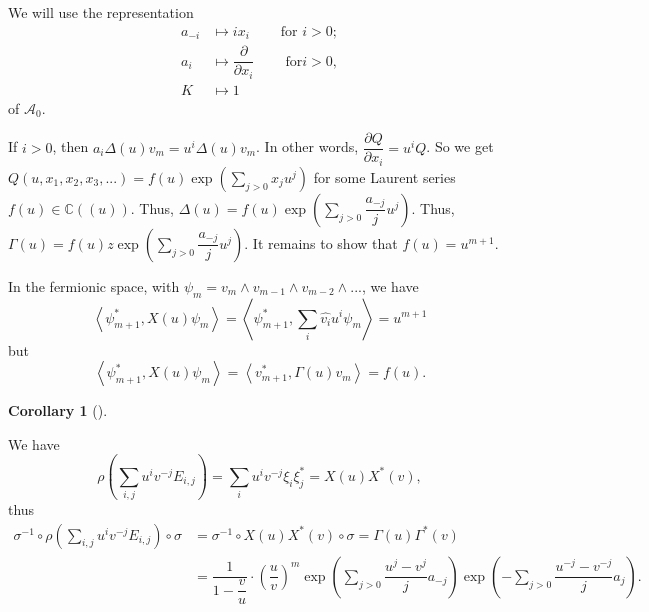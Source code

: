 \documentclass
[numbers=enddot,12pt,final,onecolumn,german,notitlepage]{scrartcl}%
\theoremstyle{definition}
\newtheorem{coro}[theo]{Corollary}
\newenvironment{corollary}[1][]
{\begin{coro}[#1]\begin{leftbar}}
{\end{leftbar}\end{coro}}
\begin{document}
We will use the representation%
\begin{align*}
a_{-i}  &  \mapsto ix_{i}\ \ \ \ \ \ \ \ \ \ \text{for }i>0;\\
a_{i}  &  \mapsto\dfrac{\partial}{\partial x_{i}}\ \ \ \ \ \ \ \ \ \ \text{for
}i>0,\\
K  &  \mapsto1
\end{align*}
of $\mathcal{A}_{0}$.

If $i>0$, then $a_{i}\Delta\left(  u\right)  v_{m}=u^{i}\Delta\left(
u\right)  v_{m}$. In other words, $\dfrac{\partial Q}{\partial x_{i}}=u^{i}Q$.
So we get $Q\left(  u,x_{1},x_{2},x_{3},...\right)  =f\left(  u\right)
\exp\left(  \sum\limits_{j>0}x_{j}u^{j}\right)  $ for some Laurent series
$f\left(  u\right)  \in\mathbb{C}\left(  \left(  u\right)  \right)  $. Thus,
$\Delta\left(  u\right)  =f\left(  u\right)  \exp\left(  \sum\limits_{j>0}%
\dfrac{a_{-j}}{j}u^{j}\right)  $. Thus, $\Gamma\left(  u\right)  =f\left(
u\right)  z\exp\left(  \sum\limits_{j>0}\dfrac{a_{-j}}{j}u^{j}\right)  $. It
remains to show that $f\left(  u\right)  =u^{m+1}$.

In the fermionic space, with $\psi_{m}=v_{m}\wedge v_{m-1}\wedge v_{m-2}%
\wedge...$, we have%
\[
\left\langle \psi_{m+1}^{\ast},X\left(  u\right)  \psi_{m}\right\rangle
=\left\langle \psi_{m+1}^{\ast},\sum\limits_{i}\widehat{v_{i}}u^{i}\psi
_{m}\right\rangle =u^{m+1}%
\]
but%
\[
\left\langle \psi_{m+1}^{\ast},X\left(  u\right)  \psi_{m}\right\rangle
=\left\langle v_{m+1}^{\ast},\Gamma\left(  u\right)  v_{m}\right\rangle
=f\left(  u\right)  .
\]


\begin{corollary}
We have%
\[
\rho\left(  \sum\limits_{i,j}u^{i}v^{-j}E_{i,j}\right)  =\sum\limits_{i}%
u^{i}v^{-j}\xi_{i}\xi_{j}^{\ast}=X\left(  u\right)  X^{\ast}\left(  v\right)
,
\]
thus%
\begin{align*}
\sigma^{-1}\circ\rho\left(  \sum\limits_{i,j}u^{i}v^{-j}E_{i,j}\right)
\circ\sigma &  =\sigma^{-1}\circ X\left(  u\right)  X^{\ast}\left(  v\right)
\circ\sigma=\Gamma\left(  u\right)  \Gamma^{\ast}\left(  v\right) \\
&  =\dfrac{1}{1-\dfrac{v}{u}}\cdot\left(  \dfrac{u}{v}\right)  ^{m}\exp\left(
\sum\limits_{j>0}\dfrac{u^{j}-v^{j}}{j}a_{-j}\right)  \exp\left(
-\sum\limits_{j>0}\dfrac{u^{-j}-v^{-j}}{j}a_{j}\right)  .
\end{align*}

\end{corollary}
\end{document}
